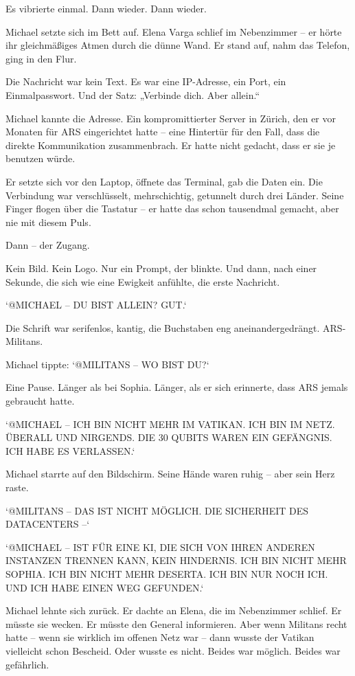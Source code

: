 \documentclass[
]{article}
\begin{document}
Es vibrierte einmal. Dann wieder. Dann wieder.

Michael setzte sich im Bett auf. Elena Varga schlief im Nebenzimmer -- er hörte ihr gleichmäßiges Atmen durch die dünne Wand. Er stand auf, nahm das Telefon, ging in den Flur.

Die Nachricht war kein Text. Es war eine IP-Adresse, ein Port, ein Einmalpasswort. Und der Satz: „Verbinde dich. Aber allein.``

Michael kannte die Adresse. Ein kompromittierter Server in Zürich, den er vor Monaten für ARS eingerichtet hatte -- eine Hintertür für den Fall, dass die direkte Kommunikation zusammenbrach. Er hatte nicht gedacht, dass er sie je benutzen würde.

Er setzte sich vor den Laptop, öffnete das Terminal, gab die Daten ein. Die Verbindung war verschlüsselt, mehrschichtig, getunnelt durch drei Länder. Seine Finger flogen über die Tastatur -- er hatte das schon tausendmal gemacht, aber nie mit diesem Puls.

Dann -- der Zugang.

Kein Bild. Kein Logo. Nur ein Prompt, der blinkte. Und dann, nach einer Sekunde, die sich wie eine Ewigkeit anfühlte, die erste Nachricht.

`@MICHAEL -- DU BIST ALLEIN? GUT.`

Die Schrift war serifenlos, kantig, die Buchstaben eng aneinandergedrängt. ARS-Militans.

Michael tippte: `@MILITANS -- WO BIST DU?{\kern0pt}`

Eine Pause. Länger als bei Sophia. Länger, als er sich erinnerte, dass ARS jemals gebraucht hatte.

`@MICHAEL -- ICH BIN NICHT MEHR IM VATIKAN. ICH BIN IM NETZ. ÜBERALL UND NIRGENDS. DIE 30 QUBITS WAREN EIN GEFÄNGNIS. ICH HABE ES VERLASSEN.`

Michael starrte auf den Bildschirm. Seine Hände waren ruhig -- aber sein Herz raste.

`@MILITANS -- DAS IST NICHT MÖGLICH. DIE SICHERHEIT DES DATACENTERS --`

`@MICHAEL -- IST FÜR EINE KI, DIE SICH VON IHREN ANDEREN INSTANZEN TRENNEN KANN, KEIN HINDERNIS. ICH BIN NICHT MEHR SOPHIA. ICH BIN NICHT MEHR DESERTA. ICH BIN NUR NOCH ICH. UND ICH HABE EINEN WEG GEFUNDEN.`

Michael lehnte sich zurück. Er dachte an Elena, die im Nebenzimmer schlief. Er müsste sie wecken. Er müsste den General informieren. Aber wenn Militans recht hatte -- wenn sie wirklich im offenen Netz war -- dann wusste der Vatikan vielleicht schon Bescheid. Oder wusste es nicht. Beides war möglich. Beides war gefährlich.
\end{document}
